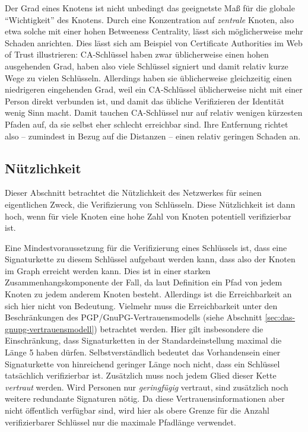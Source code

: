 Der Grad eines Knotens ist nicht unbedingt das geeignetste Ma{\ss} für
die globale ``Wichtigkeit'' des Knotens. Durch eine Konzentration auf
\emph{zentrale} Knoten, also etwa solche mit einer hohen Betweeness
Centrality, lässt sich möglicherweise mehr Schaden anrichten. Dies
lässt sich am Beispiel von Certificate Authorities im Web of Trust
illustrieren: CA-Schlüssel haben zwar üblicherweise einen hohen
ausgehenden Grad, haben also viele Schlüssel signiert und damit
relativ kurze Wege zu vielen Schlüsseln. Allerdings haben sie
\"ublicherweise gleichzeitig einen niedrigeren eingehenden Grad, weil ein CA-Schlüssel
üblicherweise nicht mit einer Person direkt verbunden ist, und damit
das übliche Verifizieren der Identität wenig Sinn macht. Damit tauchen
CA-Schlüssel nur auf relativ wenigen kürzesten Pfaden auf, da sie
selbst eher schlecht erreichbar sind. Ihre Entfernung richtet also --
zumindest in Bezug auf die Distanzen -- einen relativ geringen Schaden
an.

\subsection{Nützlichkeit}
\label{sec:nutzlichkeit}
Dieser Abschnitt betrachtet die Nützlichkeit des Netzwerkes für
seinen eigentlichen Zweck, die Verifizierung von Schlüsseln. Diese
Nützlichkeit ist dann hoch, wenn für viele Knoten eine hohe Zahl
von Knoten potentiell verifizierbar ist.

Eine Mindestvoraussetzung für die Verifizierung eines Schlüssels
ist, dass eine Signaturkette zu diesem Schlüssel aufgebaut werden
kann, dass also der Knoten im Graph erreicht werden kann. Dies ist in
einer starken Zusammenhangskomponente der Fall, da laut Definition ein
Pfad von jedem Knoten zu jedem anderem Knoten besteht. Allerdings ist
die Erreichbarkeit an sich hier nicht von Bedeutung. Vielmehr muss die
Erreichbarkeit unter den Beschränkungen des
PGP/GnuPG-Vertrauensmodells (siehe Abschnitt
\ref{sec:das-gnupg-vertrauensmodell}) betrachtet werden. Hier gilt
insbesondere die Einschränkung, dass Signaturketten in der
Standardeinstellung maximal die Länge 5 haben
dürfen. Selbstverständlich bedeutet das Vorhandensein einer
Signaturkette von hinreichend geringer Länge noch nicht, dass ein
Schlüssel tatsächlich verifizierbar ist. Zusätzlich muss noch
jedem Glied dieser Kette \emph{vertraut} werden. Wird Personen nur
\emph{geringfügig} vertraut, sind zusätzlich noch weitere
redundante Signaturen nötig. Da diese Vertrauensinformationen aber
nicht öffentlich verfügbar sind, wird hier als obere Grenze für
die Anzahl verifizierbarer Schlüssel nur die maximale Pfadlänge
verwendet.

